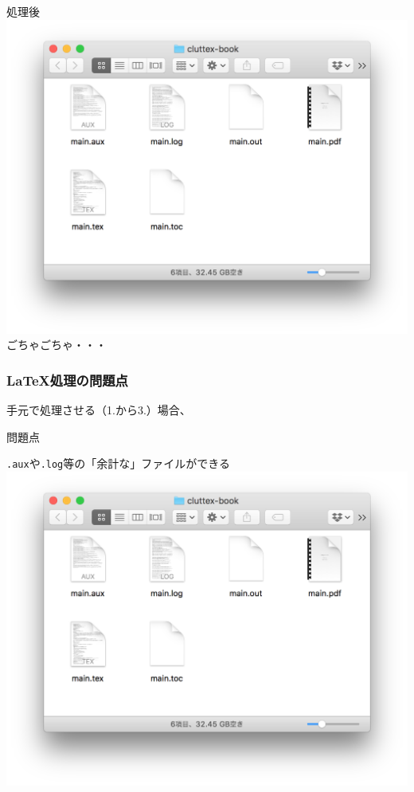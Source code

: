 \documentclass[aspectratio=169]{beamer}
\begin{document}
\begin{frame}[plain]
  \begin{block}{処理後}
    \centering
    \includegraphics[height=0.6\paperheight]{latex-after.png}\\
    \LARGE ごちゃごちゃ・・・
  \end{block}
\end{frame}
\begin{frame}\frametitle{\LaTeX 処理の問題点}
  手元で処理させる（1.から3.）場合、
  \begin{block}{問題点}
    \begin{center}
      \LARGE \texttt{.aux}や\texttt{.log}等の「余計な」ファイルができる\\
    \includegraphics[height=0.5\paperheight]{latex-after.png}
    \end{center}
  \end{block}
\end{frame}
\end{document}
